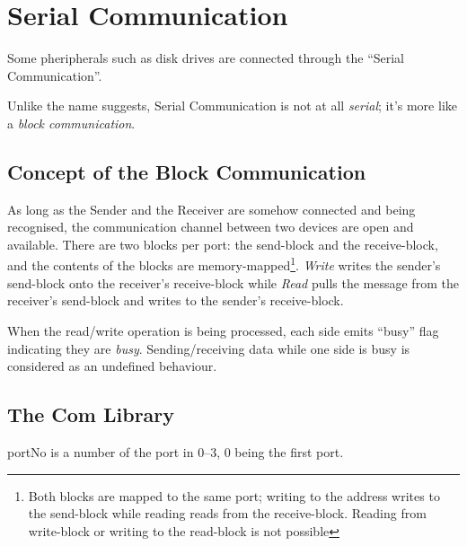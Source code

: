 




\chapter{Serial Communication}

Some pheripherals such as disk drives are connected through the ``Serial Communication''.

Unlike the name suggests, Serial Communication is not at all \emph{serial}; it's more like a \emph{block communication}.

\section{Concept of the Block Communication}

As long as the Sender and the Receiver are somehow connected and being recognised, the communication channel between two devices are open and available. There are two blocks per port: the send-block and the receive-block, and the contents of the blocks are memory-mapped\footnote{Both blocks are mapped to the same port; writing to the address writes to the send-block while reading reads from the receive-block. Reading from write-block or writing to the read-block is not possible}. \emph{Write} writes the sender's send-block onto the receiver's receive-block while \emph{Read} pulls the message from the receiver's send-block and writes to the sender's receive-block.

When the read/write operation is being processed, each side emits ``busy'' flag indicating they are \emph{busy}. Sending/receiving data while one side is busy is considered as an undefined behaviour.


\section{The Com Library}

portNo is a number of the port in 0--3, 0 being the first port.


